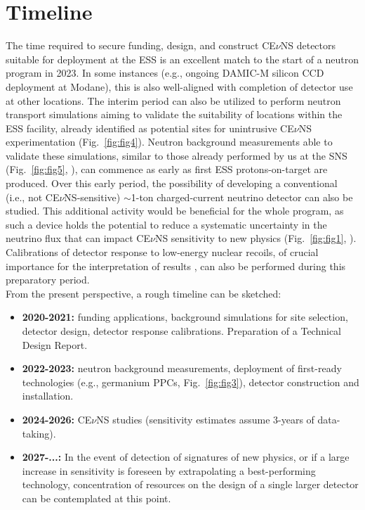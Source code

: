 
\section{Timeline}

The time required to secure funding, design, and construct CE$\nu$NS detectors suitable for deployment at the ESS is an excellent match to the start of a neutron program in 2023. In some instances (e.g., ongoing DAMIC-M silicon CCD deployment at Modane), this is also well-aligned with  completion of detector use at other locations. The interim period can also be  utilized to perform neutron transport simulations aiming to validate the suitability of locations within the ESS facility,  already identified as potential  sites for unintrusive CE$\nu$NS experimentation (Fig.\ \ref{fig:fig4}). Neutron background measurements able to validate these simulations, similar to those already performed by us at the SNS (Fig.\ \ref{fig:fig5}, \cite{science,bjorn}), can commence as early as first ESS protons-on-target are produced. Over this early period, the possibility  of developing a conventional (i.e., not CE$\nu$NS-sensitive) $\sim$1-ton charged-current neutrino detector \cite{d2o} can also be studied. This additional activity would be beneficial for the whole program, as such a device  holds the potential to reduce a systematic uncertainty in the neutrino flux that can impact CE$\nu$NS sensitivity to new physics (Fig.\ \ref{fig:fig1}, \cite{ESS}). Calibrations of detector response to low-energy nuclear recoils, of crucial importance for the interpretation of results \cite{csiqf}, can also be performed during this preparatory period. \\

From the present perspective, a rough timeline can be sketched:


\begin{itemize}
\item {\bf 2020-2021:} funding applications, background simulations for site selection, detector design, detector response calibrations. Preparation of a Technical Design Report. 
\item {\bf 2022-2023:} neutron background measurements, deployment of first-ready technologies (e.g., germanium PPCs, Fig.\ \ref{fig:fig3}), detector construction and installation.  
\item {\bf 2024-2026:} CE$\nu$NS studies (sensitivity estimates \cite{ESS} assume 3-years of data-taking).
\item {\bf 2027-...:} In the event of detection of signatures of new physics, or if a large increase in sensitivity is foreseen by extrapolating a best-performing technology, concentration of resources on the design of a single larger detector can be contemplated at this point.  
\end{itemize}

